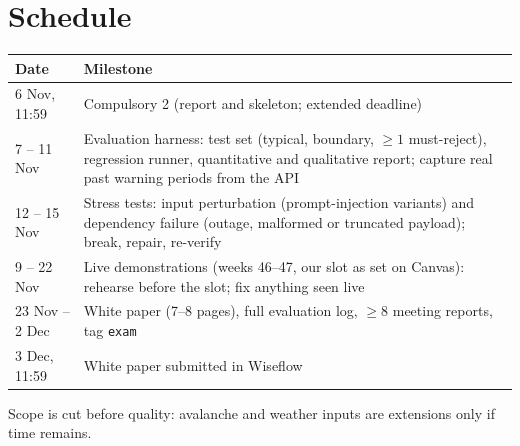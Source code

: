 \documentclass{article}
\begin{document}
\section{Schedule}
\begin{center}\small
\begin{tabular}{@{}p{2.6cm}p{10.3cm}@{}}
\toprule
Date & Milestone \\
\midrule
6 Nov, 11:59 & Compulsory 2 (report and skeleton; extended deadline) \\
7 -- 11 Nov & Evaluation harness: test set (typical, boundary, $\geq 1$ must-reject), regression runner, quantitative and qualitative report; capture real past warning periods from the API \\
12 -- 15 Nov & Stress tests: input perturbation (prompt-injection variants) and dependency failure (outage, malformed or truncated payload); break, repair, re-verify \\
9 -- 22 Nov & Live demonstrations (weeks 46--47, our slot as set on Canvas): rehearse before the slot; fix anything seen live \\
23 Nov -- 2 Dec & White paper (7--8 pages), full evaluation log, $\geq 8$ meeting reports, tag \texttt{exam} \\
3 Dec, 11:59 & White paper submitted in Wiseflow \\
\bottomrule
\end{tabular}
\end{center}
Scope is cut before quality: avalanche and weather inputs are extensions only if time remains.
\end{document}
